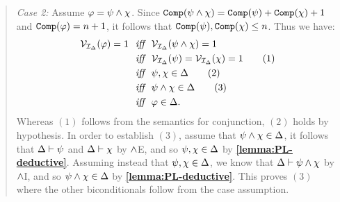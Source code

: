 \begin{quote}
  \textit{Case 2:}
  Assume $\varphi = \psi \wedge \chi$.
  Since $\texttt{Comp}(\psi\wedge\chi)=\texttt{Comp}(\psi)+\texttt{Comp}(\chi)+1$ and  $\texttt{Comp}(\varphi)=n+1$, it follows that $\texttt{Comp}(\psi),\texttt{Comp}(\chi)\leq n$.
  Thus we have:
  \begin{align*}
    \mathcal{V}_{\mathcal{I}_{\Delta}}(\varphi)=1 &\textit{ ~iff~ } \mathcal{V}_{\mathcal{I}_{\Delta}}(\psi\wedge\chi)=1\\
      &\textit{ ~iff~ } \mathcal{V}_{\mathcal{I}_{\Delta}}(\psi)=\mathcal{V}_{\mathcal{I}_{\Delta}}(\chi)=1   \tag{1} \\
      &\textit{ ~iff~ } \psi,\chi\in\Delta                          \tag{2} \\
      &\textit{ ~iff~ } \psi\wedge\chi\in\Delta                      \tag{3} \\
      &\textit{ ~iff~ } \varphi\in\Delta.
  \end{align*}
  Whereas $(1)$ follows from the semantics for conjunction, $(2)$ holds by hypothesis.
  In order to establish $(3)$, assume that $\psi\wedge\chi\in\Delta$, it follows that $\Delta\vdash\psi$ and $\Delta\vdash\chi$ by $\wedge$E, and so $\psi,\chi\in\Delta$ by \textbf{\ref{lemma:PL-deductive}}.
  Assuming instead that $\psi,\chi\in\Delta$, we know that $\Delta\vdash\psi\wedge\chi$ by $\wedge$I, and so $\psi\wedge\chi\in\Delta$ by \textbf{\ref{lemma:PL-deductive}}.
  This proves $(3)$ where the other biconditionals follow from the case assumption.



\end{quote}
